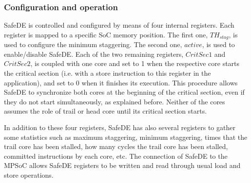 \subsubsection{Configuration and operation}
SafeDE is controlled and configured by means of four internal registers. Each register is mapped to a specific SoC memory position. The first one, $TH_{stag}$, is used to configure the minimum staggering. The second one, $active$, is used to enable/disable SafeDE. Each of the two remaining registers, $CritSec1$ and $CritSec2$, is coupled with one core and set to 1 when the respective core starts the critical section (i.e. with a store instruction to this register in the application), and set to 0 when it finishes its execution. This procedure allows SafeDE to synchronize both cores at the beginning of the critical section, even if they do not start simultaneously, as explained before. Neither of the cores assumes the role of trail or head core until its critical section starts. 


In addition to these four registers, SafeDE has also several registers to gather some statistics such as maximum staggering, minimum staggering, times that the trail core has been stalled, how many cycles the trail core has been stalled, committed instructions by each core, etc. The connection of SafeDE to the MPSoC allows SafeDE registers to be written and read through usual load and store operations. 

